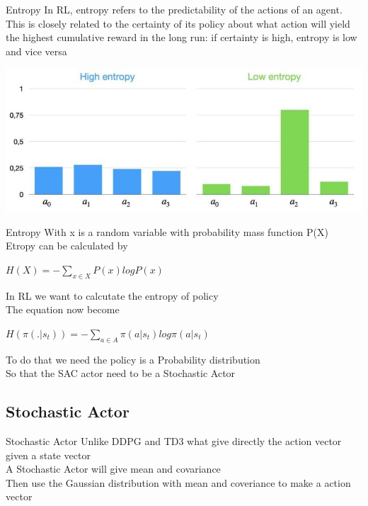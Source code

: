 \documentclass{beamer}
\begin{document}
\begin{frame}{Entropy}
In RL, entropy refers to the predictability of the actions of an agent.\\
This is closely related to the certainty of its policy about what action will yield the highest cumulative reward in the long run: if certainty is high, entropy is low and vice versa
    \begin{center}
        \includegraphics[scale=0.6]{entropy.jpg}\\
    \end{center}
\end{frame}

\begin{frame}{Entropy}
    With x is a random variable with probability mass function P(X)\\
    Etropy can be calculated by
    \begin{center}
        $H(X) = - \underset{x \in X}{\sum} P(x)logP(x)$\\
    \end{center}
    In RL we want to calcutate the entropy of policy \pi\\
    The equation now become\\
    \begin{center}
        $H(\pi(.|s_t)) = - \underset{a \in A}{\sum} \pi(a|s_t)log\pi(a|s_t)$\\
    \end{center}
    To do that we need the policy \pi is a Probability distribution \\
    So that the SAC actor need to be a Stochastic Actor
\end{frame}

\subsection{Stochastic Actor}

\begin{frame}{Stochastic Actor}
    Unlike DDPG and TD3 what give directly  the action vector given a state vector\\
    A Stochastic Actor will give mean and covariance \\
    Then use the Gaussian distribution with mean and coveriance to make a action vector\\
\end{frame}
\end{document}
